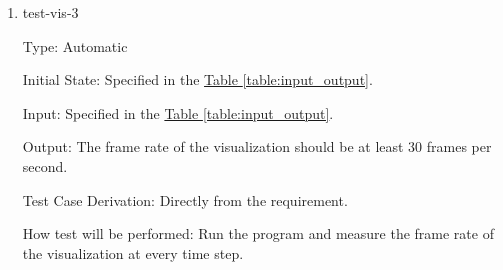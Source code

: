 \documentclass[12pt, titlepage]{article}
\begin{document}
\begin{enumerate}
\item{test-vis-3\\}

Type: Automatic
					
Initial State: Specified in the \hyperref[table:input_output]{Table \ref*{table:input_output}}.
					
Input: Specified in the \hyperref[table:input_output]{Table \ref*{table:input_output}}.
					
Output: The frame rate of the visualization should be at least 30 frames per second.

Test Case Derivation: Directly from the requirement.

How test will be performed: Run the program and measure the frame rate of 
the visualization at every time step.

\end{enumerate}


		



					
					
					

					
					
\end{document}
